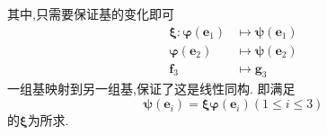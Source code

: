 \begin{brown}
\begin{Proof}
\begin{tikzpicture}[x=0.75pt,y=0.75pt,yscale=-1,xscale=1]
\end{tikzpicture}
\newpage
其中,只需要保证基的变化即可
\begin{align*}
    \bm{\xi}:\bm{\varphi}\left(\bm{e}_1\right)&\longmapsto \bm{\psi}\left(\bm{e}_1\right)\\
    \bm{\varphi}\left(\bm{e}_2\right)&\longmapsto \bm{\psi}\left(\bm{e}_2\right) \\
    \bm{f}_3&\longmapsto \bm{g}_3
\end{align*}
一组基映射到另一组基,保证了这是线性同构.
即满足\[
\bm{\psi}\left(\bm{e}_i\right)=\bm{\xi}\bm{\varphi}\left(\bm{e}_i\right)\left(1\leqslant i\leqslant 3\right)
\]
的$\bm{\xi}$为所求.
\end{Proof}
\end{brown}